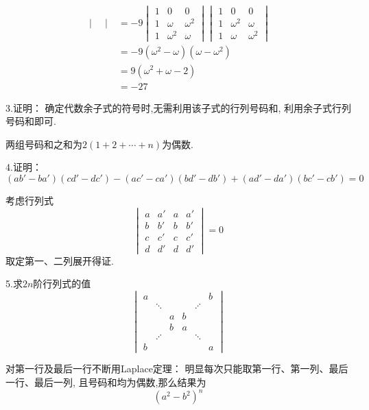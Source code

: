 \begin{solution}
\begin{align*}
\begin{vmatrix}
\end{vmatrix}&=-9\begin{vmatrix}
	1&0&0\\
	1&\omega&\omega^2\\
	1&\omega^2&\omega
\end{vmatrix}\begin{vmatrix}
	1&0&0\\
	1&\omega^2&\omega\\
	1&\omega&\omega^2
\end{vmatrix}\\
&=-9\left(\omega^2-\omega\right)\left(
	\omega-\omega^2
\right)\\
&=9\left(\omega^2+\omega-2\right)
\\
&=-27
	\end{align*}
\end{solution}

3.证明：
	确定代数余子式的符号时,无需利用该子式的行列号码和,
	利用余子式行列号码和即可.
	\begin{Proof}
		两组号码和之和为$2\left(1+2+\cdots+n\right)$为偶数.
	\end{Proof}

4.证明：
\[
\left(ab'-ba'\right)\left(cd'-dc'\right)-\left(
	ac'-ca'
\right)\left(bd'-db'\right)+\left(
	ad'-da'
\right)\left(bc'-cb'\right)=0
\]
\begin{Proof}
	考虑行列式
\[
\begin{vmatrix}
	a&a'&a&a'\\
	b&b'&b&b'\\
	c&c'&c&c'\\
	d&d'&d&d'
\end{vmatrix}=0
\]
取定第一、二列展开得证.
\end{Proof}

5.求$2n$阶行列式的值
\[
\begin{vmatrix}
	a&&&&&b\\
	&\ddots&&&\iddots &\\
	&&a&b&&\\
	&&b&a&&\\
	&\iddots &&&\ddots &\\
	b&&&&&a
\end{vmatrix}
\]
\begin{solution}
	对第一行及最后一行不断用\textup{Laplace}定理：
	明显每次只能取第一行、第一列、最后一行、最后一列,
	且号码和均为偶数,那么结果为
	\[
	\left(a^2-b^2\right)^n
	\]
\end{solution}
